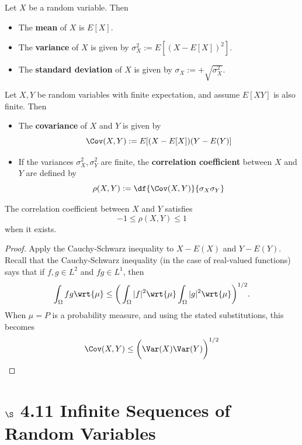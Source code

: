 \documentclass{article} %
\begin{document}
\begin{definition}
Let $X$ be a random variable.  Then 
\begin{itemize}
\item The \textbf{mean} of $X$ is $E[X]$.
\item The \textbf{variance} of $X$ is given by $\sigma^2_X:=E[(X-E[X])^2]$.
\item The \textbf{standard deviation} of $X$ is given by $\sigma_X:=+\sqrt{\sigma^2_X}$.
\end{itemize}
\end{definition}

\begin{definition}
Let $X, Y$ be random variables with finite expectation, and assume $E[XY]$ is also finite.  Then 
\begin{itemize}
\item The \textbf{covariance} of $X$ and $Y$ is given by
\[ \Cov(X,Y) := E[(X-E[X])(Y-E(Y)]\]
\item If the variances $\sigma^2_X, \sigma^2_Y$ are finite, the \textbf{correlation coefficient} between $X$ and $Y$ are defined by
\[ \rho(X,Y):= \df{\Cov(X,Y)}{\sigma_X \sigma_Y}\]
\end{itemize}
\end{definition}

\begin{proposition}
The correlation coefficient between $X$ and $Y$ satisfies
\[-1 \leq \rho(X,Y) \leq 1  \]	
when it exists.
\end{proposition}

\begin{proof}
Apply the Cauchy-Schwarz inequality to $X-E(X)$ and $Y-E(Y)$.\\

{\scriptsize Recall \cite[pp.85]{ash2000probability} that the Cauchy-Schwarz inequality (in the case of real-valued functions) says that if $f,g \in L^2$ and $fg \in L^1$, then 
\[ \int_\Omega fg \wrt{\mu} \leq \bigg( \int_\Omega |f|^2 \wrt{\mu} \int_\Omega |g|^2 \wrt{\mu} \bigg)^{1/2}.\]
When $\mu=P$ is a probability measure, and using the stated substitutions, this becomes
\[ \Cov(X,Y) \leq \bigg(\Var(X) \Var(Y) \bigg)^{1/2} \]
}

\end{proof}

\section{$\S$ 4.11 Infinite Sequences of Random Variables}
\end{document}
